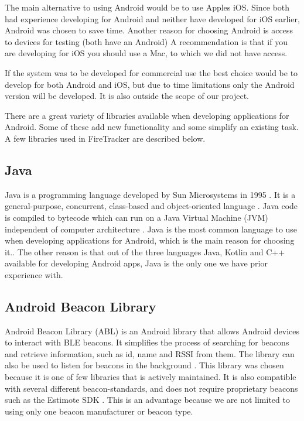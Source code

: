 \documentclass[../Main/thesis.tex]{subfiles}
\begin{document}
The main alternative to using Android would be to use Apples iOS.
Since both had experience developing for Android and neither have developed for iOS earlier, Android  was chosen to save time.
Another reason for choosing Android is access to devices for testing (both have an Android)
A recommendation is that if you are developing for iOS you should use a Mac, to which we did not have access.

If the system was to be developed for commercial use the best choice would be to develop for both Android and iOS, but due to time limitations only the Android version will be developed. 
It is also outside the scope of our project.

There are a great variety of libraries available when developing applications for Android.
Some of these add new functionality and some simplify an existing task.
A few libraries used in FireTracker are described below. 

\subsection{Java}
Java is a programming language developed by Sun Microsystems in 1995 \citep{SunMicrosystems1996}. 
It is a general-purpose, concurrent, class-based and object-oriented language \citep[p. 1]{Gosling2018}.
Java code is compiled to bytecode which can run on a Java Virtual Machine (JVM) independent of computer architecture \citep{Venners2000}. 
Java is the most common language to use when developing applications for Android, which is the main reason for choosing it..
The other reason is that out of the three languages Java, Kotlin and C++ \citep{Google2018b} available for developing Android apps, Java is the only one we have prior experience with.


\subsection{Android Beacon Library}
Android Beacon Library (ABL) is an Android library that allows Android devices to interact with BLE beacons. 
It simplifies the process of searching for beacons and retrieve information, such as id, name and RSSI from them.
The library can also be used to listen for beacons in the background \citep{RadiusNetwork2015}.
This library was chosen because it is one of few libraries that is actively maintained.
It is also compatible with several different beacon-standards, and does not require proprietary beacons such as the Estimote SDK \citep{Estimote2017}.
This is an advantage because we are not limited to using only one beacon manufacturer or beacon type.
\end{document}
